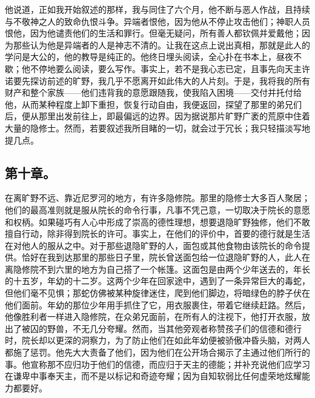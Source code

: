 他说道，正如我开始叙述的那样，我与同住了六个月，他不断与恶人作战，且持续与不敬神之人的致命仇恨斗争。异端者恨他，因为他从不停止攻击他们；神职人员恨他，因为他谴责他们的生活和罪行。但毫无疑问，所有善人都钦佩并爱戴他；因为那些认为他是异端者的人是神志不清的。让我在这点上说出真相，那就是此人的学问是大公的，他的教导是纯正的。他终日埋头阅读，全心扑在书本上，昼夜不歇；他不停地要么阅读，要么写作。事实上，若不是我心志已定，且事先向天主许诺要先探访前述的旷野，我几乎不愿离开如此伟大的人片刻。于是，我将我的所有财产和整个家族——他们违背我的意愿跟随我，使我陷入困境——交付并托付给他，从而某种程度上卸下重担，恢复行动自由，我便返回，探望了那里的弟兄们后，便从那里出发前往上，即最偏远的边界。因为据说那片旷野广袤的荒原中住着大量的隐修士。然而，若要叙述我所目睹的一切，就会过于冗长；我只轻描淡写地提几点。\par


\subsection{第十章。}

在离旷野不远、靠近尼罗河的地方，有许多隐修院。那里的隐修士大多百人聚居；他们的最高准则就是服从院长的命令行事，凡事不凭己意，一切取决于院长的意愿和权柄。如果碰巧有人心中形成了崇高的德性理想，想要退隐旷野独修，他们不敢擅自行动，除非得到院长的许可。事实上，在他们的评价中，首要的德行就是生活在对他人的服从之中。对于那些退隐旷野的人，面包或其他食物由该院长的命令提供。恰好在我到达那里的那些日子里，院长曾送面包给一位退隐旷野的人，此人在离隐修院不到六里的地方为自己搭了一个帐篷。这面包是由两个少年送去的，年长的十五岁，年幼的十二岁。这两个少年在回家途中，遇到了一条异常巨大的毒蛇，但他们毫不见惧；那蛇仿佛被某种旋律迷住，爬到他们脚边，将暗绿色的脖子伏在他们面前。年幼的那位少年用手抓住了它，用衣服裹住，带着它继续赶路。然后，他像胜利者一样进入隐修院，在众弟兄面前，在所有人的注视下，他打开衣服，放出了被囚的野兽，不无几分夸耀。然而，当其他旁观者称赞孩子们的信德和德行时，院长却以更深的洞察力，为了防止他们在如此年幼便被骄傲冲昏头脑，对两人都施了惩罚。他先大大责备了他们，因为他们在公开场合揭示了主通过他们所行的事。他宣称那不应归功于他们的信德，而应归于天主的德能；并补充说他们应学习在谦卑中事奉天主，而不是以标记和奇迹夸耀；因为自知软弱比任何虚荣地炫耀能力都要好。\par


